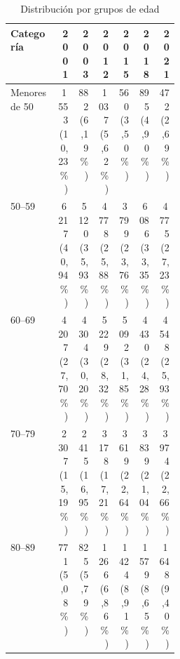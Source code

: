 \begin{table}[!htbp]
\centering
\caption{Distribución por grupos de edad}\label{tab:cp1-edades}
\small\setlength{\tabcolsep}{4pt}
\renewcommand{\arraystretch}{1.15}
\begin{tabular}{p{0.28\linewidth}rrrrrr}
\toprule
\textbf{Categoría} & \textbf{2001} & \textbf{2003} & \textbf{2012} & \textbf{2015} & \textbf{2018} & \textbf{2021} \\
\midrule
Menores de 50 & \shortstack[r]{1\,553\\(10,23\%)} & \shortstack[r]{882\\(6,19\%)} & \shortstack[r]{1\,037\\(5,62\%)} & \shortstack[r]{560\\(3,50\%)} & \shortstack[r]{895\\(4,90\%)} & \shortstack[r]{472\\(2,69\%)} \\
50--59 & \shortstack[r]{6\,217\\(40,94\%)} & \shortstack[r]{5\,120\\(35,93\%)} & \shortstack[r]{4\,778\\(25,88\%)} & \shortstack[r]{3\,799\\(23,76\%)} & \shortstack[r]{6\,086\\(33,35\%)} & \shortstack[r]{4\,775\\(27,23\%)} \\
60--69 & \shortstack[r]{4\,207\\(27,70\%)} & \shortstack[r]{4\,304\\(30,20\%)} & \shortstack[r]{5\,229\\(28,32\%)} & \shortstack[r]{5\,092\\(31,85\%)} & \shortstack[r]{4\,430\\(24,28\%)} & \shortstack[r]{4\,548\\(25,93\%)} \\
70--79 & \shortstack[r]{2\,307\\(15,19\%)} & \shortstack[r]{2\,415\\(16,95\%)} & \shortstack[r]{3\,178\\(17,21\%)} & \shortstack[r]{3\,619\\(22,64\%)} & \shortstack[r]{3\,839\\(21,04\%)} & \shortstack[r]{3\,974\\(22,66\%)} \\
80--89 & \shortstack[r]{771\\(5,08\%)} & \shortstack[r]{825\\(5,79\%)} & \shortstack[r]{1\,266\\(6,86\%)} & \shortstack[r]{1\,424\\(8,91\%)} & \shortstack[r]{1\,579\\(8,65\%)} & \shortstack[r]{1\,648\\(9,40\%)} \\

\end{tabular}
\end{table}
